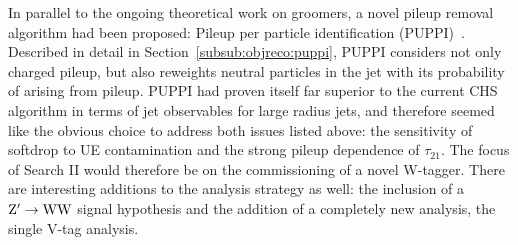 In parallel to the ongoing theoretical work on groomers, a novel pileup removal algorithm had been proposed: Pileup per particle identification (PUPPI)~\cite{Bertolini2014}. Described in detail in Section~\ref{subsub:objreco:puppi}, PUPPI considers not only charged pileup, but also reweights neutral particles in the jet with its probability of arising from pileup. PUPPI had proven itself far superior to the current CHS algorithm in terms of jet observables for large radius jets, and therefore seemed like the obvious choice to address both issues listed above: the sensitivity of softdrop to UE contamination and the strong pileup dependence of $\tau_{21}$. The focus of Search II would therefore be on the commissioning of a novel W-tagger. There are interesting additions to the analysis strategy as well: the inclusion of a $\mathrm{Z}^\prime \rightarrow \mathrm{W}\mathrm{W}$ signal hypothesis and the addition of a completely new analysis, the single V-tag analysis.

